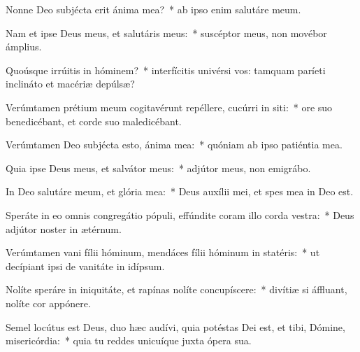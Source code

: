 \item Nonne Deo subjécta erit ánima mea?~* ab ipso enim salutáre meum.

\item Nam et ipse Deus meus, et salutáris meus:~* suscéptor meus, non movébor ámplius.

\item Quoúsque irrúitis in hóminem?~* interfícitis univérsi vos: tamquam paríeti inclináto et macériæ depúlsæ?

\item Verúmtamen prétium meum cogitavérunt repéllere, cucúrri in siti:~* ore suo benedicébant, et corde suo maledicébant.

\item Verúmtamen Deo subjécta esto, ánima mea:~* quóniam ab ipso patiéntia mea.

\item Quia ipse Deus meus, et salvátor meus:~* adjútor meus, non emigrábo.

\item In Deo salutáre meum, et glória mea:~* Deus auxílii mei, et spes mea in Deo est.

\item Speráte in eo omnis congregátio pópuli, effúndite coram illo corda vestra:~* Deus adjútor noster in ætérnum.

\item Verúmtamen vani fílii hóminum, mendáces fílii hóminum in statéris:~* ut decípiant ipsi de vanitáte in idípsum.

\item Nolíte speráre in iniquitáte, et rapínas nolíte concupíscere:~* divítiæ si áffluant, nolíte cor appónere.

\item Semel locútus est Deus, duo hæc audívi, quia potéstas Dei est, et tibi, Dómine, misericórdia:~* quia tu reddes unicuíque juxta ópera sua.